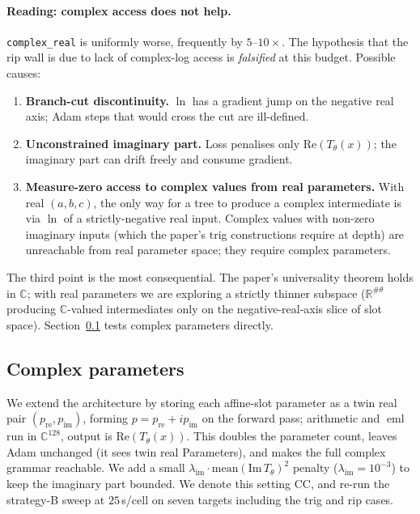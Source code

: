 \documentclass[11pt]{article}
\newcommand{\eml}{\operatorname{eml}}
\begin{document}
\paragraph{Reading: complex access does not help.}
\texttt{complex\_real} is uniformly worse, frequently by $5$--$10\times$.
The hypothesis that the rip wall is due to lack of complex-log access is
\emph{falsified} at this budget. Possible causes:
\begin{enumerate}
\item \textbf{Branch-cut discontinuity.} $\ln$ has a gradient jump on the
  negative real axis; Adam steps that would cross the cut are
  ill-defined.
\item \textbf{Unconstrained imaginary part.} Loss penalises only
  $\mathrm{Re}(T_\theta(x))$; the imaginary part can drift freely and
  consume gradient.
\item \textbf{Measure-zero access to complex values from real parameters.}
  With real $(a, b, c)$, the only way for a tree to produce a complex
  intermediate is via $\ln$ of a strictly-negative real input. Complex
  values with non-zero imaginary inputs (which the paper's trig
  constructions require at depth) are unreachable from real parameter
  space; they require complex parameters.
\end{enumerate}
The third point is the most consequential. The paper's universality theorem
holds in $\mathbb{C}$; with real parameters we are exploring a strictly
thinner subspace ($\mathbb{R}^{\#\theta}$ producing $\mathbb{C}$-valued
intermediates only on the negative-real-axis slice of slot space).
Section~\ref{sec:complex-params} tests complex parameters directly.

\subsection{Complex parameters}
\label{sec:complex-params}

We extend the architecture by storing each affine-slot parameter as a twin
real pair $(p_{\mathrm{re}}, p_{\mathrm{im}})$, forming $p =
p_{\mathrm{re}} + i p_{\mathrm{im}}$ on the forward pass; arithmetic and
$\eml$ run in $\mathbb{C}^{128}$, output is $\mathrm{Re}(T_\theta(x))$. This
doubles the parameter count, leaves Adam unchanged (it sees twin real
Parameters), and makes the full complex grammar reachable. We add a small
$\lambda_{\mathrm{im}} \cdot \mathrm{mean}(\mathrm{Im}\,T_\theta)^2$ penalty
($\lambda_{\mathrm{im}} = 10^{-3}$) to keep the imaginary part bounded. We
denote this setting CC, and re-run the strategy-B sweep at $25\,$s/cell on
seven targets including the trig and rip cases.
\end{document}
